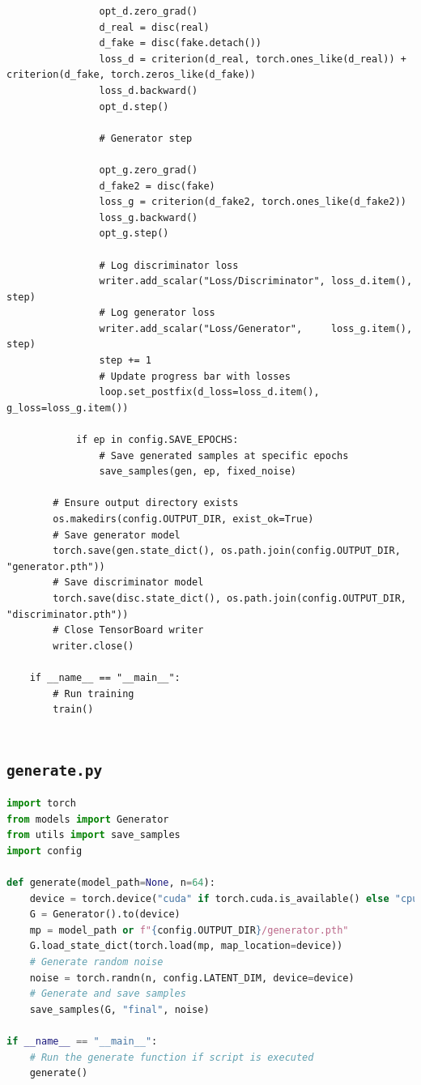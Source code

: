 \documentclass[11pt]{article}
\begin{document}
\begin{lstlisting}
                opt_d.zero_grad()
                d_real = disc(real)
                d_fake = disc(fake.detach())
                loss_d = criterion(d_real, torch.ones_like(d_real)) + criterion(d_fake, torch.zeros_like(d_fake))
                loss_d.backward()
                opt_d.step()
    
                # Generator step
                
                opt_g.zero_grad()
                d_fake2 = disc(fake)
                loss_g = criterion(d_fake2, torch.ones_like(d_fake2))
                loss_g.backward()
                opt_g.step()
    
                # Log discriminator loss
                writer.add_scalar("Loss/Discriminator", loss_d.item(), step)  
                # Log generator loss
                writer.add_scalar("Loss/Generator",     loss_g.item(), step)  
                step += 1
                # Update progress bar with losses
                loop.set_postfix(d_loss=loss_d.item(), g_loss=loss_g.item())  
    
            if ep in config.SAVE_EPOCHS:
                # Save generated samples at specific epochs
                save_samples(gen, ep, fixed_noise)  
    
        # Ensure output directory exists
        os.makedirs(config.OUTPUT_DIR, exist_ok=True)  
        # Save generator model
        torch.save(gen.state_dict(), os.path.join(config.OUTPUT_DIR, "generator.pth"))  
        # Save discriminator model
        torch.save(disc.state_dict(), os.path.join(config.OUTPUT_DIR, "discriminator.pth"))  
        # Close TensorBoard writer
        writer.close()  
    
    if __name__ == "__main__":
        # Run training
        train()  
    
    \end{lstlisting}
    
\subsection{\texttt{generate.py}}

\begin{lstlisting}[language=Python, caption={Generation}, label={lst:config}, frame=single, basicstyle=\ttfamily\small, keywordstyle=\color{blue}\bfseries, commentstyle=\color{green!50!black}, stringstyle=\color{red!70!black}]
import torch
from models import Generator  
from utils import save_samples
import config 

def generate(model_path=None, n=64):
    device = torch.device("cuda" if torch.cuda.is_available() else "cpu")  
    G = Generator().to(device)  
    mp = model_path or f"{config.OUTPUT_DIR}/generator.pth"  
    G.load_state_dict(torch.load(mp, map_location=device))  
    # Generate random noise
    noise = torch.randn(n, config.LATENT_DIM, device=device)  
    # Generate and save samples
    save_samples(G, "final", noise)  

if __name__ == "__main__":
    # Run the generate function if script is executed
    generate()  

\end{lstlisting}
\end{document}
